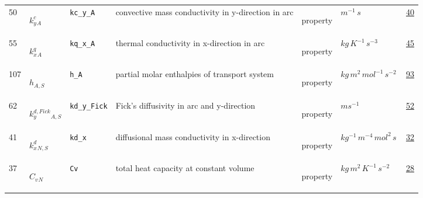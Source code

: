 \begin{longtable}{|p{1cm}|p{2.5cm}|p{4.5cm}|p{8cm}|p{3.0cm}|p{3cm}|p{1cm}|}
            50
             & \hypertarget{"v:50"}{ $ {{k^c_y}}{_{A}} $}
             & \verb|kc_y_A|
             &  convective mass conductivity in y-direction in arc
             & \begin{lay}property \end{lay}
             & $ m^{-1} \,s \, $
             &                 \hyperlink{"e:40"}{ 40 }
                 \\
            55
             & \hypertarget{"v:55"}{ $ {{k^q_x}}{_{A}} $}
             & \verb|kq_x_A|
             & thermal conductivity in x-direction in arc
             & \begin{lay}property \end{lay}
             & $ kg \,K^{-1} \,s^{-3} \, $
             &                 \hyperlink{"e:45"}{ 45 }
                 \\
            107
             & \hypertarget{"v:107"}{ $ {h}{_{A, S}} $}
             & \verb|h_A|
             & partial molar enthalpies of transport system
             & \begin{lay}property \end{lay}
             & $ kg \,m^{2} \,mol^{-1} \,s^{-2} \, $
             &                 \hyperlink{"e:93"}{ 93 }
                 \\
            62
             & \hypertarget{"v:62"}{ $ {{k^{d,Fick}_y}}{_{A, S}} $}
             & \verb|kd_y_Fick|
             & Fick's diffusivity in arc and y-direction 
             & \begin{lay}property \end{lay}
             & $ m s^{-1} \, $
             &                 \hyperlink{"e:52"}{ 52 }
                 \\
            41
             & \hypertarget{"v:41"}{ $ {{k^d_x}}{_{N, S}} $}
             & \verb|kd_x|
             & diffusional mass conductivity in x-direction
             & \begin{lay}property \end{lay}
             & $ kg^{-1} \,m^{-4} \,mol^{2} \,s \, $
             &                 \hyperlink{"e:32"}{ 32 }
                 \\
            37
             & \hypertarget{"v:37"}{ $ {{C_v}}{_{N}} $}
             & \verb|Cv|
             & total heat capacity at constant volume
             & \begin{lay}property \end{lay}
             & $ kg \,m^{2} \,K^{-1} \,s^{-2} \, $
             &                 \hyperlink{"e:28"}{ 28 }

\end{longtable}
